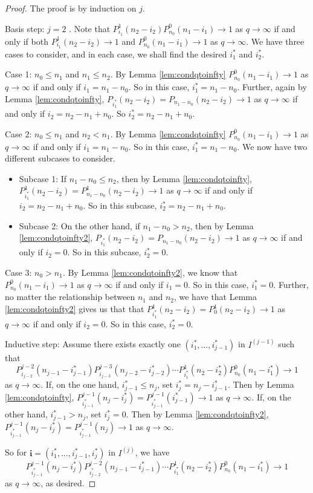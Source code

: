 \begin{proof}
The proof is by induction on $j$.


Basis step: $j=2$ .  Note that $P_{i_1}^1(n_2 - i_2)P_{n_0}^0 (n_1 - i_1) \to 1$ as $q\to\infty$ if and only if both $P_{i_1}^1(n_2 - i_2) \to 1$ and $P_{n_0}^0 (n_1 - i_1) \to 1$ as $q\to \infty$.  We have three cases to consider, and in each case, we shall find the desired $i_1^\ast$ and $i_2^\ast$.

Case 1: $n_0\leq n_1$ and $n_1\leq n_2$.  By Lemma \ref{lem:condqtoinfty} $P_{n_0}^0 (n_1 - i_1) \to 1$ as $q\to\infty$ if and only if $i_1 = n_1 - n_0$.  So in this case, $i_1^\ast = n_1 - n_0$.  Further, again by Lemma \ref{lem:condqtoinfty}, $P_{i_1^\ast}(n_2 - i_2) = P_{n_1 - n_0}(n_2 - i_2)  \to 1$ as $q\to\infty$ if and only if $i_2 = n_2 - n_1 + n_0$.  So $i_2^\ast = n_2 - n_1 + n_0$.

Case 2: $n_0 \leq n_1$ and $n_2 <n_1$. By Lemma \ref{lem:condqtoinfty} $P_{n_0}^0 (n_1 - i_1) \to 1$ as $q\to\infty$ if and only if $i_1 = n_1 - n_0$. So in this case, $i_1^\ast = n_1 - n_0$. We now have two different subcases to consider.
	\begin{itemize}
	\item Subcase 1: If $n_1 - n_0\leq n_2$, then by Lemma \ref{lem:condqtoinfty}, $P_{i_1^\ast}^1(n_2 - i_2) = P_{n_1-n_0}^1(n_2-i_2) \to 1$ as $q\to\infty$ if and only if $i_2 = n_2 - n_1 + n_0$.  So in this subcase, $i_2^\ast = n_2 - n_1 + n_0$.
	\item Subcase 2: On the other hand, if $n_1 - n_0 >n_2$, then by Lemma \ref{lem:condqtoinfty2}, $P_{i_1^\ast}(n_2 - i_2) = P_{n_1-n_0}(n_2-i_2) \to 1$ as $q\to\infty$ if and only if $i_2 = 0$.  So in this subcase, $i_2^\ast = 0$.
	\end{itemize}
	
Case 3: $n_0 > n_1$. By Lemma \ref{lem:condqtoinfty2}, we know that $P_{n_0}^0 (n_1 - i_1) \to 1$ as $q\to\infty$ if and only if $i_1 = 0$. So in this case, $i_1^\ast = 0$.  Further, no matter the relationship between $n_1$ and $n_2$, we have that Lemma \ref{lem:condqtoinfty2} gives us that that $P_{i_1^\ast}^1(n_2 - i_2) = P_{0}^1(n_2 - i_2)\to 1$ as $q\to\infty$ if and only if $i_2 = 0$.  So in this case, $i_2^\ast = 0$.

Inductive step: Assume there exists exactly one $(i_1^\ast,\ldots , i_{j-1}^\ast)$ in $I^{(j-1)}$ such that 
\[
P_{i_{j-2}}^{j-2}(n_{j-1} - i_{j-1}^\ast)P_{i_{j-3}}^{j-3}(n_{j-2} - i_{j-2}^\ast) \cdots P_{i_1^\ast}^1 (n_2 - i_2^\ast) P_{n_0}^0 (n_1 - i_1^\ast) \to 1
\]
as $q\to\infty$. If, on the one hand, $i_{j-1}^\ast \leq n_j$, set $i_j^\ast = n_j-i_{j-1}^\ast$.  Then by Lemma \ref{lem:condqtoinfty}, $P_{i_{j-1}^\ast}^{j-1}(n_j - i_j^\ast) = P_{i_{j-1}^\ast}^{j-1}(i_{j-1}^\ast) \to 1$ as $q\to\infty$. If, on the other hand, $i_{j-1}^\ast > n_j$, set $i_j^\ast = 0$. Then by Lemma \ref{lem:condqtoinfty2}, $P_{i_{j-1}^\ast}^{j-1}(n_j - i_j^\ast) = P_{i_{j-1}^\ast}^{j-1}(n_j ) \to 1$ as $q \to\infty$.  

So for $\mathbf{i} = (i_1^\ast,\ldots, i_{j-1}^\ast, i_j^\ast)$ in $I^{(j)}$, we have
\[
P_{i_{j-1}^\ast}^{j-1}(n_j-i_j^\ast)P_{i_{j-2}^\ast}^{j-2}(n_{j-1}-i_{j-1}^\ast)\cdots P_{i_1^\ast}^1(n_2-i_2^\ast)P_{n_0}^0(n_1-i_1^\ast) \to 1
\]
as $q\to\infty$, as desired.
\end{proof}

